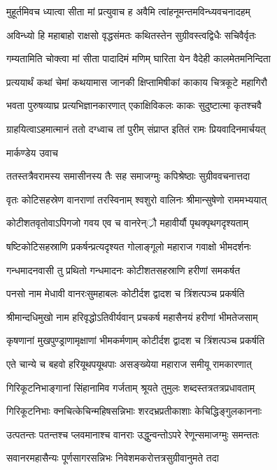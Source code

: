 \twolineshloka
{मुहूर्तमिवच ध्यात्वा सीता मां प्रत्युवाच ह}
{अवैमि त्वांहनूमन्तमविन्ध्यवचनादहम्}


\twolineshloka
{अविन्ध्यो हि महाबाहो राक्षसो वृद्धसंमतः}
{कथितस्तेन सुग्रीवस्त्वद्विधैः सचिवैर्वृतः}


\twolineshloka
{गम्यतामिति चोक्त्वा मां सीता पादादिमं मणिम्}
{घारिता येन वैदेही कालमेतमनिन्दिता}


\twolineshloka
{प्रत्ययार्थं कथां चेमां कथयामास जानकी}
{क्षिप्तामिषीकां काकाय चित्रकूटे महागिरौ}


\twolineshloka
{भवता पुरुषव्याघ्र प्रत्यभिज्ञानकारणात्}
{एकाक्षिविकलः काकः सुदुष्टात्मा कृतश्चवै}


\twolineshloka
{ग्राहयित्वाऽहमात्मानं ततो दग्ध्वाच तां पुरीम्}
{संप्राप्त इतितं रामः प्रियवादिनमार्चयत्}


\twolineshloka
{मार्कण्डेय उवाच}
{}


\twolineshloka
{ततस्तत्रैवरामस्य समासीनस्य तैः सह}
{समाजग्मुः कपिश्रेष्ठाः सुग्रीववचनात्तदा}


\twolineshloka
{वृतः कोटिसहस्रेण वानराणां तरस्विनाम्}
{श्वशुरो वालिनः श्रीमान्सुषेणो राममभ्ययात्}


\twolineshloka
{कोटीशतवृतोवाऽपिगजो गवय एव च}
{वानरेन््रौ महावीर्यौ पृथक्पृथगदृश्यताम्}


\twolineshloka
{षष्टिकोटिसहस्राणि प्रकर्षन्प्रत्यदृश्यत}
{गोलाङ्गूलो महाराज गवाक्षो भीमदर्शनः}


\twolineshloka
{गन्धमादनवासी तु प्रथितो गन्धमादनः}
{कोटीशतसहस्राणि हरीणां समकर्षत}


\twolineshloka
{पनसो नाम मेधावी वानरःसुमहाबलः}
{कोटीर्दश द्वादश च त्रिंशत्पञ्च प्रकर्षति}


\twolineshloka
{श्रीमान्दधिमुखो नाम हरिवृद्धोऽतिवीर्यवान्}
{प्रचकर्ष महासैनयं हरीणां भीमतेजसाम्}


\twolineshloka
{कृषणानां मुखपुण्ड्राणामृक्षाणां भीमकर्मणाम्}
{कोटीर्दश द्वादश च त्रिंशत्पञ्च प्रकर्षति}


\twolineshloka
{एते चान्ये च बहवो हरियूथपयूथपाः}
{असङ्ख्येया महाराज समीयू रामकारणात्}


\twolineshloka
{गिरिकूटनिभाङ्गानां सिंहानामिव गर्जताम्}
{श्रूयते तुमुलः शब्दस्तत्रतत्रप्रधावताम्}


\twolineshloka
{गिरिकूटनिभाः क्नचित्केचिन्महिषसन्निभाः}
{शरदभ्रप्रतीकाशाः केचिद्धिङ्गुलकाननाः}


\twolineshloka
{उत्पतन्तः पतन्तश्च प्लवमानाश्च वानराः}
{उद्धुन्वन्तोऽपरे रेणून्समाजग्मुः समन्ततः}


\twolineshloka
{सवानरमहासैन्यः पूर्णसागरसन्निभः}
{निवेशमकरोत्तत्रसुग्रीवानुमते तदा}


